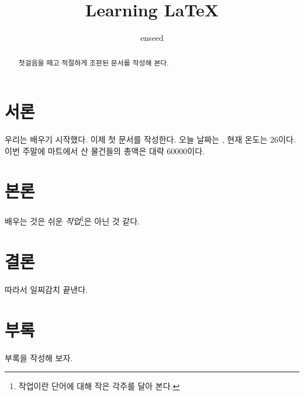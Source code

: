 \documentclass[a4paper]{article}
\author{enseed}
\title{Learning \LaTeX}
\begin{document}
\maketitle

\begin{abstract}
     첫걸음을 떼고 적절하게 조판된 문서를 작성해 본다.
    
\end{abstract}

\tableofcontents

\section{서론}
우리는  배우기 시작했다. 이제 첫 문서를
작성한다.
오늘 날짜는 , 현재 온도는 26\textcelsius{}이다. 이번 주말에 마트에서 산 물건들의 총액은 대략 \textwon60000이다.

\section{본론}
 배우는 것은 쉬운 \emph{작업}\footnote{작업이란 단어에 대해 작은 각주를 달아 본다.}은 아닌 것 같다. 

\section{결론}

따라서 일찌감치 끝낸다.

\appendix
\section {부록}
부록을 작성해 보자.
\end{document}
